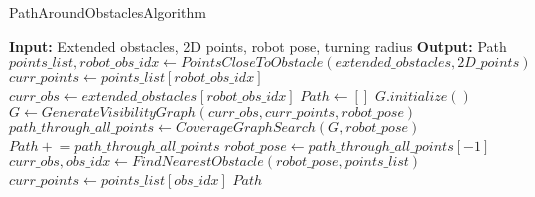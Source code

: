     

    



\begin{algorithm}[H]
    \caption{PathAroundObstaclesAlgorithm}
    \begin{algorithmic}[1]
        \Statex \textbf{Input:} Extended obstacles, 2D points, robot pose, turning radius
        \Statex \textbf{Output:} Path
        \newline
        \State $points\_list, robot\_obs\_idx \gets PointsCloseToObstacle(extended\_obstacles, 2D\_points)$
        \State $curr\_points \gets points\_list[robot\_obs\_idx]$    
        \State $curr\_obs \gets extended\_obstacles[robot\_obs\_idx]$
        \State $Path \gets []$
            \State $G.initialize()$
            \State $G \gets GenerateVisibilityGraph(curr\_obs, curr\_points, robot\_pose)$ 
            \State $path\_through\_all\_points \gets CoverageGraphSearch(G, robot\_pose)$
            \State $Path \mathrel{+}= path\_through\_all\_points$
            \State $robot\_pose \gets path\_through\_all\_points[-1]$
            \State $curr\_obs, obs\_idx \gets FindNearestObstacle(robot\_pose, points\_list)$
            \State $curr\_points \gets points\_list[obs\_idx]$
        \EndFor
        \State \Return $Path$
    \end{algorithmic}
\end{algorithm}

